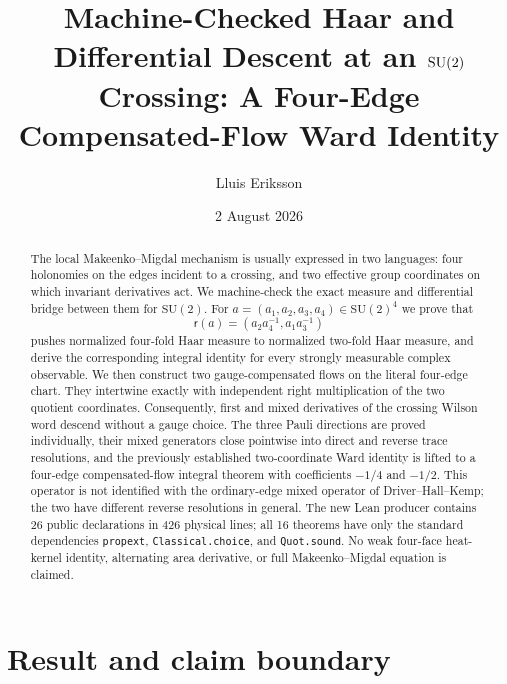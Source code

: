 \documentclass[11pt]{article}
\title{\vspace{-1.5em}\textbf{Machine-Checked Haar and Differential Descent at
an $\SU$ Crossing: A Four-Edge Compensated-Flow Ward Identity}}
\author{Lluis Eriksson}
\date{2 August 2026}
\theoremstyle{definition}
\newcommand{\SU}{\mathrm{SU}(2)}
\newcommand{\red}{\mathsf r}
\begin{document}
\maketitle

\begin{abstract}
The local Makeenko--Migdal mechanism is usually expressed in two languages:
four holonomies on the edges incident to a crossing, and two effective group
coordinates on which invariant derivatives act.  We machine-check the exact
measure and differential bridge between them for $\SU$.  For
$a=(a_1,a_2,a_3,a_4)\in\SU^4$ we prove that
\[
 \red(a)=(a_2a_4^{-1},a_1a_3^{-1})
\]
pushes normalized four-fold Haar measure to normalized two-fold Haar measure,
and derive the corresponding integral identity for every strongly measurable
complex observable.  We then construct two gauge-compensated flows on the
literal four-edge chart.  They intertwine exactly with independent right
multiplication of the two quotient coordinates.  Consequently, first and
mixed derivatives of the crossing Wilson word descend without a gauge choice.
The three Pauli directions are proved individually, their
mixed generators close pointwise into direct and reverse trace resolutions,
and the previously established two-coordinate Ward identity is lifted to a
four-edge compensated-flow integral theorem with coefficients $-1/4$ and
$-1/2$.  This operator is not identified with the ordinary-edge mixed
operator of Driver--Hall--Kemp; the two have different reverse resolutions in
general.  The new Lean
producer contains 26 public declarations in 426 physical lines;
all 16 theorems have only the standard dependencies \texttt{propext},
\texttt{Classical.choice}, and \texttt{Quot.sound}.  No weak four-face
heat-kernel identity, alternating area derivative, or full
Makeenko--Migdal equation is claimed.
\end{abstract}

\section{Result and claim boundary}
\end{document}
